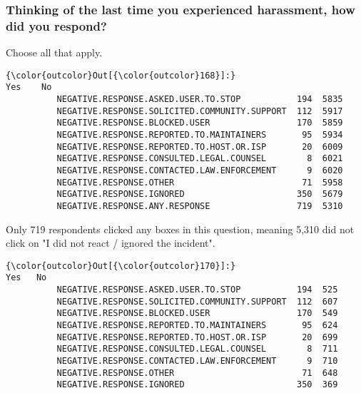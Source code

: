 \documentclass[11pt]{article}
\begin{document}
    \subsubsection{Thinking of the last time you experienced harassment, how
did you
respond?}\label{thinking-of-the-last-time-you-experienced-harassment-how-did-you-respond}

Choose all that apply.


            \begin{Verbatim}[commandchars=\\\{\}]
{\color{outcolor}Out[{\color{outcolor}168}]:}                                                Yes    No
          NEGATIVE.RESPONSE.ASKED.USER.TO.STOP           194  5835
          NEGATIVE.RESPONSE.SOLICITED.COMMUNITY.SUPPORT  112  5917
          NEGATIVE.RESPONSE.BLOCKED.USER                 170  5859
          NEGATIVE.RESPONSE.REPORTED.TO.MAINTAINERS       95  5934
          NEGATIVE.RESPONSE.REPORTED.TO.HOST.OR.ISP       20  6009
          NEGATIVE.RESPONSE.CONSULTED.LEGAL.COUNSEL        8  6021
          NEGATIVE.RESPONSE.CONTACTED.LAW.ENFORCEMENT      9  6020
          NEGATIVE.RESPONSE.OTHER                         71  5958
          NEGATIVE.RESPONSE.IGNORED                      350  5679
          NEGATIVE.RESPONSE.ANY.RESPONSE                 719  5310
\end{Verbatim}
        
    Only 719 respondents clicked any boxes in this question, meaning 5,310
did not click on "I did not react / ignored the incident".



            \begin{Verbatim}[commandchars=\\\{\}]
{\color{outcolor}Out[{\color{outcolor}170}]:}                                                Yes   No
          NEGATIVE.RESPONSE.ASKED.USER.TO.STOP           194  525
          NEGATIVE.RESPONSE.SOLICITED.COMMUNITY.SUPPORT  112  607
          NEGATIVE.RESPONSE.BLOCKED.USER                 170  549
          NEGATIVE.RESPONSE.REPORTED.TO.MAINTAINERS       95  624
          NEGATIVE.RESPONSE.REPORTED.TO.HOST.OR.ISP       20  699
          NEGATIVE.RESPONSE.CONSULTED.LEGAL.COUNSEL        8  711
          NEGATIVE.RESPONSE.CONTACTED.LAW.ENFORCEMENT      9  710
          NEGATIVE.RESPONSE.OTHER                         71  648
          NEGATIVE.RESPONSE.IGNORED                      350  369
\end{Verbatim}
        
\end{document}
